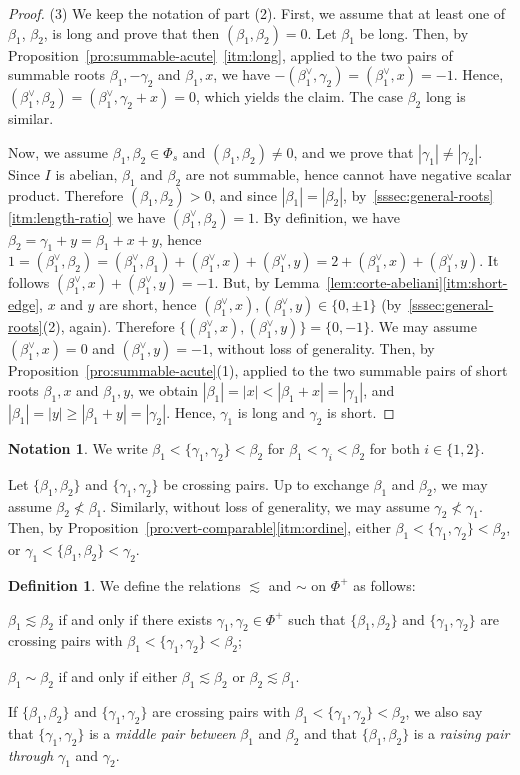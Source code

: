 \documentclass[10pt]{amsart}
\theoremstyle{definition}
\newtheorem{defi}[thm]{Definition}
\newtheorem{ntn}[thm]{Notation}
\theoremstyle{remark}
\newcommand\be{\beta}
\newcommand\ga{\gamma}
\begin{document}
\begin{proof}
(3)
We keep the notation of  part (2).
First, we assume that at least one of $\be_1$, $\be_2$, is long and prove that then $(\be_1, \be_2)=0$.
Let  $\be_1$ be long. 
Then, by Proposition~\ref{pro:summable-acute}~\ref{itm:long}, applied to the two pairs of summable roots $\be_1, -\ga_2$ and $\be_1, x$, we have $-(\be_1^\vee, \ga_2)=(\be_1^\vee, x)=-1$. 
Hence, $(\be_1^\vee, \be_2)=(\be_1^\vee, \ga_2+ x)=0$, which yields the claim.
The case $\be_2$ long is similar.
\par
Now, we assume $\be_1,\be_2\in \Phi_s$ and $(\be_1, \be_2)\neq 0$, and we prove that $|\ga_1|\neq |\ga_2|$.
Since $I$ is abelian, $\be_1$ and $\be_2$ are not summable, hence cannot have negative scalar product. 
Therefore $(\be_1, \be_2)> 0$, and since $|\be_1|=|\be_2|$,  by~\ref{sssec:general-roots}\ref{itm:length-ratio} we have $(\be_1^\vee, \be_2)=1$.  
By definition, we have $\be_2=\ga_1+y=\be_1+x+y$, hence 
$1=(\be_1^\vee, \be_2)=(\be_1^\vee, \be_1)+(\be_1^\vee, x)+(\be_1^\vee, y)=2+(\be_1^\vee, x)+(\be_1^\vee, y)$. 
It follows $(\be_1^\vee, x)+(\be_1^\vee, y)=-1$.
But, by Lemma~\ref{lem:corte-abeliani}\ref{itm:short-edge}, $x$ and $y$ are short, hence $(\be_1^\vee, x), (\be_1^\vee, y)\in \{0, \pm 1\}$  (by~\ref{sssec:general-roots}(2), again).
Therefore $\{(\be_1^\vee, x), (\be_1^\vee, y)\}=\{0, -1\}$.
We may assume $(\be_1^\vee, x)=0$ and $(\be_1^\vee, y)=-1$, without loss of generality.
Then, by Proposition~\ref{pro:summable-acute}(1), applied to the two summable pairs of short roots $\be_1, x$ and $\be_1, y$, we obtain $|\be_1|=|x|<|\be_1+x|=|\ga_1|$,  and $|\be_1|=|y|\geq |\be_1+y|=|\ga_2|$.  
Hence, $\ga_1$ is long and $\ga_2$ is short. 
\end{proof}

\begin{ntn}
We write $\be_1< \{\ga_1, \ga_2\}< \be_2$ for  $\be_1< \ga_i<\be_2$ for both $i\in \{1, 2\}$.
\end{ntn} 

Let $\{\be_1, \be_2\}$ and $\{\ga_1, \ga_2\}$ be crossing pairs. 
Up to exchange $\be_1$ and $\be_2$, we may assume $\be_2\not<\be_1$. 
Similarly, without loss of generality, we may assume $\ga_2\not< \ga_1$.
Then, by Proposition~\ref{pro:vert-comparable}\ref{itm:ordine}, either $\be_1< \{\ga_1, \ga_2\}< \be_2$, or $\ga_1< \{\be_1, \be_2\}< \ga_2$. 

\begin{defi}\label{def:lesssim}
We define the relations $\lesssim$ and $\sim$ on $\Phi^+$ as follows: 
\par
$\be_1\lesssim\be_2$
if and only if there exists $\ga_1, \ga_2\in \Phi^+$ such that 
 $\{\be_1, \be_2\}$ and $\{\ga_1, \ga_2\}$ are crossing pairs with $\be_1< \{\ga_1, \ga_2\}< \be_2$;
\par 
$\be_1\sim\be_2$
if and only if either $\be_1\lesssim \be_2$  or $\be_2\lesssim \be_1$.
\par
If  $\{\be_1, \be_2\}$ and $\{\ga_1, \ga_2\}$ are crossing pairs with $\be_1< \{\ga_1, \ga_2\}< \be_2$, we also say that $\{\ga_1, \ga_2\}$ is a {\it middle pair between} $\be_1$ and $\be_2$ and that $\{\be_1, \be_2\}$ is a {\it raising pair through} $\ga_1$ and $\ga_2$.
\end{defi}
\end{document}
